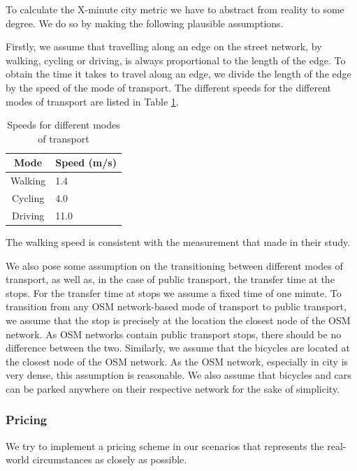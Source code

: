 To calculate the X-minute city metric we have to abstract from reality to some degree.
We do so by making the following plausible assumptions.

Firstly, we assume that travelling along an edge on the street network, by walking, cycling or driving, is always proportional to the length of the edge.
To obtain the time it takes to travel along an edge, we divide the length of the edge by the speed of the mode of transport.
The different speeds for the different modes of transport are listed in Table \ref{table:speeds}.

\begin{table}[h]
\centering
\begin{tabular}{|c|l|}
\hline
\textbf{Mode} & \textbf{Speed (m/s)} \\
\hline
Walking & 1.4 \\
\hline
Cycling & 4.0 \\
\hline
Driving & 11.0 \\
\hline
\end{tabular}
\caption{Speeds for different modes of transport}
\label{table:speeds}
\end{table}

The walking speed is consistent with the measurement that \cite{willberg15minuteCityAll2023} made in their study.

We also pose some assumption on the transitioning between different modes of transport, as well as, in the case of public transport, the transfer time at the stops.
For the transfer time at stops we assume a fixed time of one minute.
To transition from any OSM network-based mode of transport to public transport, we assume that the stop is precisely at the location the closest node of the OSM network.
As OSM networks contain public transport stops, there should be no difference between the two.
Similarly, we assume that the bicycles are located at the closest node of the OSM network.
As the OSM network, especially in city is very dense, this assumption is reasonable.
We also assume that bicycles and cars can be parked anywhere on their respective network for the sake of simplicity.


\subsubsection{Pricing}
\label{subs:pricing}

We try to implement a pricing scheme in our scenarios that represents the real-world circumstances as closely as possible.

